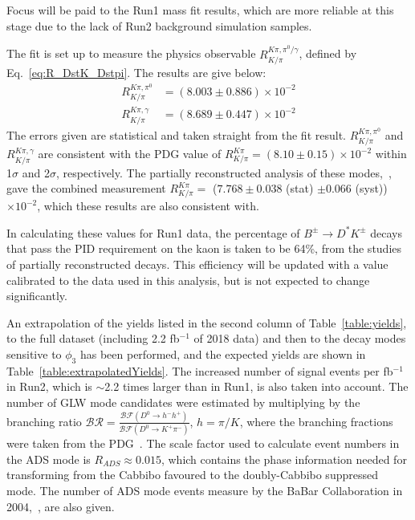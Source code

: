 \documentclass[oneside,12pt]{article}
\begin{document}
Focus will be paid to the Run1 mass fit results, which are more reliable at
this stage due to the lack of Run2 background simulation samples.

The fit is set up to measure the physics observable $R^{K\pi , \pi^0
/\gamma}_{K/\pi}$, defined by Eq.~\ref{eq:R_DstK_Dstpi}. The results are give
below:
\begin{align*}
R^{K\pi , \pi^0}_{K/\pi} &= (8.003 \pm 0.886) \times 10^{-2} \\
R^{K\pi , \gamma}_{K/\pi} &= (8.689 \pm 0.447) \times 10^{-2} 
\end{align*} 
The errors given are statistical and taken straight from the fit result.
$R^{K\pi , \pi^0}_{K/\pi}$ and $R^{K\pi , \gamma}_{K/\pi}$ are consistent with
the PDG value of $R^{K\pi}_{K/\pi} = (8.10 \pm 0.15) \times 10^{-2}$ within
1$\sigma$ and 2$\sigma$, respectively. The partially reconstructed analysis of
these modes,~\cite{PartReco}, gave the combined measurement $R^{K\pi}_{K/\pi}
=$ ($7.768 \pm 0.038$ (stat) $\pm 0.066$ (syst)) $\times 10^{-2}$, which these
results are also consistent with. 

In calculating these values for Run1 data, the percentage of
$B^{\pm}\rightarrow D^*K^{\pm}$ decays that pass the PID requirement on the
kaon is taken to be 64\%, from the studies of partially reconstructed decays.
This efficiency will be updated with a value calibrated to the data used in
this analysis, but is not expected to change significantly.

An extrapolation of the yields listed in the second column of
Table~\ref{table:yields}, to the full dataset (including 2.2 fb$^{-1}$ of 2018
data) and then to the decay modes sensitive to $\phi_3$ has been performed, and
the expected yields are shown in Table~\ref{table:extrapolatedYields}. The
increased number of signal events per fb$^{-1}$ in Run2, which is $\sim$2.2 times
larger than in Run1, is also taken into account. The number of GLW mode
candidates were estimated by multiplying by the branching ratio $\mathcal{BR} =
\frac{\mathcal{BF}(D^0 \rightarrow h^- h^+)}{\mathcal{BF}(D^0 \rightarrow K^+
\pi^-)}$, $h=\pi/K$, where the branching fractions were taken from the
PDG~\cite{PDG2018}. The scale factor used to calculate event numbers in the ADS
mode is $R_{ADS}\approx 0.015$, which contains the phase information needed for
transforming from the Cabbibo favoured to the doubly-Cabbibo suppressed mode.
The number of ADS mode events measure by the BaBar Collaboration in
2004,~\cite{BaBarADS}, are also given.
\end{document}
